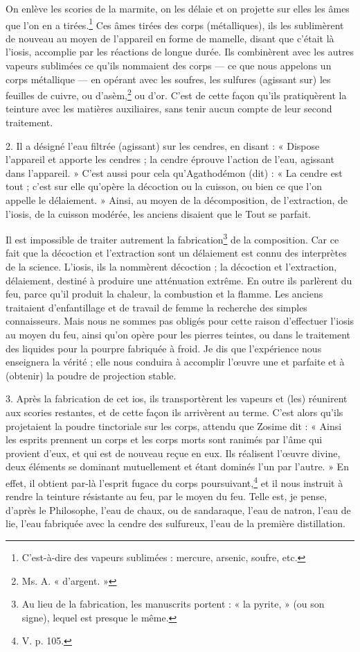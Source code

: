 \documentclass[a4paper, 11pt, oneside, polutonikogreek, french]{article}
\begin{document}
On enlève les scories de la marmite, on les délaie et on projette sur elles les âmes que l'on en a tirées.\footnote{C'est-à-dire des vapeurs sublimées : mercure, arsenic, soufre, etc.} Ces âmes tirées des corps (métalliques), ils les sublimèrent de nouveau au moyen de l'appareil en forme de mamelle, disant que c'était là l'iosis, accomplie par les réactions de longue durée. Ils combinèrent avec les autres vapeurs sublimées ce qu'ils nommaient des corps --- ce que nous appelons un corps métallique --- en opérant avec les soufres, les sulfures (agissant sur) les feuilles de cuivre, ou d'asèm,\footnote{Ms. A. « d'argent. »} ou d'or. C'est de cette façon qu'ils pratiquèrent la teinture avec les matières auxiliaires, sans tenir aucun compte de leur second traitement.

2. Il a désigné l'eau filtrée (agissant) sur les cendres, en disant : « Dispose l'appareil et apporte les cendres ; la cendre éprouve l'action de l'eau, agissant dans l'appareil. » C'est aussi pour cela qu'Agathodémon (dit) : « La cendre est tout ; c'est sur elle qu'opère la décoction ou la cuisson, ou bien ce que l'on appelle le délaiement. » Ainsi, au moyen de la décomposition, de l'extraction, de l'iosis, de la cuisson modérée, les anciens disaient que le Tout se parfait.

Il est impossible de traiter autrement la fabrication\footnote{Au lieu de la fabrication, les manuscrits portent : « la pyrite, » (ou son signe), lequel est presque le même.} de la composition. Car ce fait que la décoction et l'extraction sont un délaiement est connu des interprètes de la science. L'iosis, ils la nommèrent décoction ; la décoction et l'extraction, délaiement, destiné à produire une atténuation extrême. En outre ils parlèrent du feu, parce qu'il produit la chaleur, la combustion et la flamme. Les anciens traitaient d'enfantillage et de travail de femme la recherche des simples connaisseurs. Mais nous ne sommes pas obligés pour cette raison d'effectuer l'iosis au moyen du feu, ainsi qu'on opère pour les pierres teintes, ou dans le traitement des liquides pour la pourpre fabriquée à froid. Je dis que l'expérience nous enseignera la vérité ; elle nous conduira à accomplir l'œuvre une et parfaite et à (obtenir) la poudre de projection stable.

3. Après la fabrication de cet ios, ils transportèrent les vapeurs et (les) réunirent aux scories restantes, et de cette façon ils arrivèrent au terme. C'est alors qu'ils projetaient la poudre tinctoriale sur les corps, attendu que Zosime dit : « Ainsi les esprits prennent un corps et les corps morts sont ranimés par l'âme qui provient d'eux, et qui est de nouveau reçue en eux. Ils réalisent l'œuvre divine, deux éléments se dominant mutuellement et étant dominés l'un par l'autre. » En effet, il obtient par-là l'esprit fugace du corps poursuivant,\footnote{V. p. 105.} et il nous instruit à rendre la teinture résistante au feu, par le moyen du feu. Telle est, je pense, d'après le Philosophe, l'eau de chaux, ou de sandaraque, l'eau de natron, l'eau de lie, l'eau fabriquée avec la cendre des sulfureux, l'eau de la première distillation.
\end{document}
